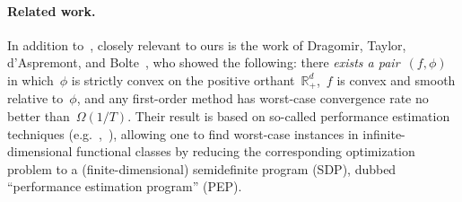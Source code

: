 \documentclass[11pt]{article}
\numberwithin{equation}{section}
\theoremstyle{remark}
\newcommand{\R}{\mathbb{R}}
\newcommand{\1}{\mathbf{1}}
\begin{document}


\paragraph{Related work.}
%
%
In addition to~\cite{GuzmanNemirovski2015},  closely relevant to ours is the work of Dragomir, Taylor, d'Aspremont, and Bolte~\cite{DragomirTaylordAspremontBolte2022}, who showed the following: 
there {\em exists a pair}~$(f,\phi)$ in which~$\phi$ is strictly convex on the positive orthant~$\R^d_+$,~$f$ is convex and smooth relative to~$\phi$,
and any first-order method has worst-case convergence rate no better than~$\Omega(1/T)$. 
Their result is based on so-called performance estimation techniques (e.g.~\cite{DroriTeboulle2014},~\cite{TaylorHendrickxGlineur2017}), allowing one to find worst-case instances in infinite-dimensional functional classes by reducing the corresponding optimization problem to a (finite-dimensional) semidefinite program (SDP), dubbed ``performance estimation program'' (PEP).
\end{document}
